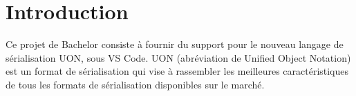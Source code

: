 \documentclass[
    iict, %
    il, %
]{heig-tb}
\begin{document}
\maketitle
\frontmatter
\clearemptydoublepage

\preamble
\let\cleardoublepage\clearpage
\authentification
\let\cleardoublepage\clearpage

\begin{abstract}
    
\end{abstract}

\listoffigures
{}
\listoflistings
{}

\tableofcontents

\printnomenclature
\clearemptydoublepage
{}

\pagestyle{fancy}
\fancyhf{}
\renewcommand\headrulewidth{1pt}

\fancyhead[L]{\itshape\nouppercase{\leftmark}}

\renewcommand{\chaptermark}[1]{\markboth{\MakeUppercase{#1}}{}}

\renewcommand\footrulewidth{1pt}


\renewcommand{\headrulewidth}{0.4pt}
\renewcommand{\footrulewidth}{0.4pt}

\titlespacing*{\chapter}{0pt}{-40pt}{20pt}

\mainmatter
\chapter{Introduction}


Ce projet de Bachelor consiste à fournir du support pour le nouveau langage de sérialisation UON, sous VS Code.
UON (abréviation de Unified Object Notation) est un format de sérialisation qui vise à rassembler les meilleures caractéristiques de tous les formats de sérialisation disponibles sur le marché.
\end{document}
